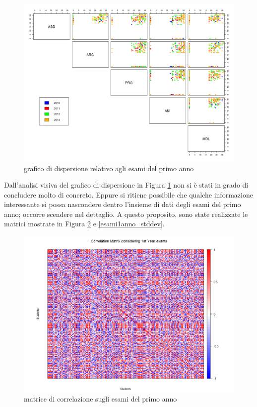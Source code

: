                 \begin{figure}
                    \centering
                    \caption{grafico di dispersione relativo agli esami del primo anno}
                    \label{esami1anno_sp}
                	\includegraphics[scale=0.32]{img/scatter_plot_4_gen.png}
                \end{figure}

                Dall’analisi visiva del grafico di dispersione in Figura \ref{esami1anno_sp} non si è stati in grado di concludere molto di concreto. Eppure si ritiene possibile che qualche informazione interessante si possa nascondere dentro l’insieme di dati degli esami del primo anno; occorre scendere nel dettaglio. A questo proposito, sono state realizzate le matrici mostrate in Figura \ref{esami1anno_corr} e \ref{esami1anno_stddev}.

                \begin{figure}
                    \centering
                    \caption{matrice di correlazione sugli esami del primo anno}
                    \label{esami1anno_corr}
                	\includegraphics[scale=0.32]{img/corr_matrix_1.png}
                \end{figure}

